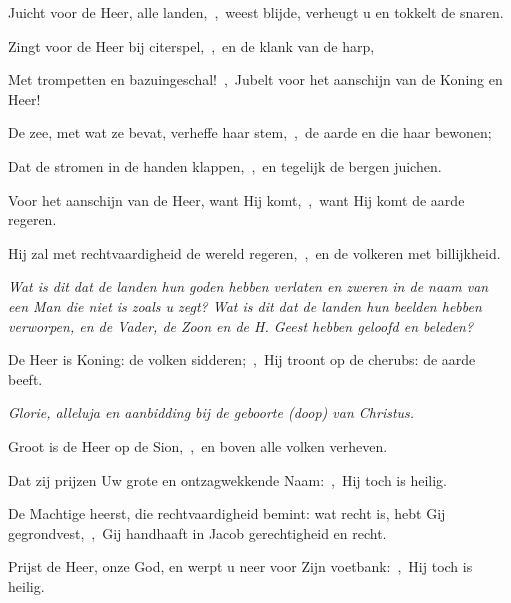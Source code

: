 \documentclass[12pt,twoside,a5paper]{article}
\begin{document}
\begin{halfparskip}
  Juicht voor de Heer, alle landen,~\sep\ weest blijde, verheugt u en tokkelt de snaren.

  Zingt voor de Heer bij citerspel,~\sep\ en de klank van de harp,

  Met trompetten en bazuingeschal!~\sep\ Jubelt voor het aanschijn van de Koning en Heer!

  De zee, met wat ze bevat, verheffe haar stem,~\sep\ de aarde en die haar bewonen;

  Dat de stromen in de handen klappen,~\sep\ en tegelijk de bergen juichen.

  Voor het aanschijn van de Heer, want Hij komt,~\sep\ want Hij komt de aarde regeren.

  Hij zal met rechtvaardigheid de wereld regeren,~\sep\ en de volkeren met billijkheid.
\end{halfparskip}

 \emph{Wat is dit dat de landen hun goden hebben verlaten en zweren in de naam van een Man die niet is zoals u zegt? Wat is dit dat de landen hun beelden hebben verworpen, en de Vader, de Zoon en de H. Geest hebben geloofd en beleden?}




\begin{halfparskip}
  De Heer is Koning: de volken sidderen;~\sep\ Hij troont op de cherubs: de aarde beeft.


   \emph{Glorie, alleluja en aanbidding bij de geboorte (doop) van Christus.}

  Groot is de Heer op de Sion,~\sep\ en boven alle volken verheven.

  Dat zij prijzen Uw grote en ontzagwekkende Naam:~\sep\ Hij toch is heilig.

  De Machtige heerst, die rechtvaardigheid bemint: wat recht is, hebt Gij gegrondvest,~\sep\ Gij handhaaft in Jacob gerechtigheid en recht.

  Prijst de Heer, onze God, en werpt u neer voor Zijn voetbank:~\sep\ Hij toch is heilig.
\end{halfparskip}
\end{document}
